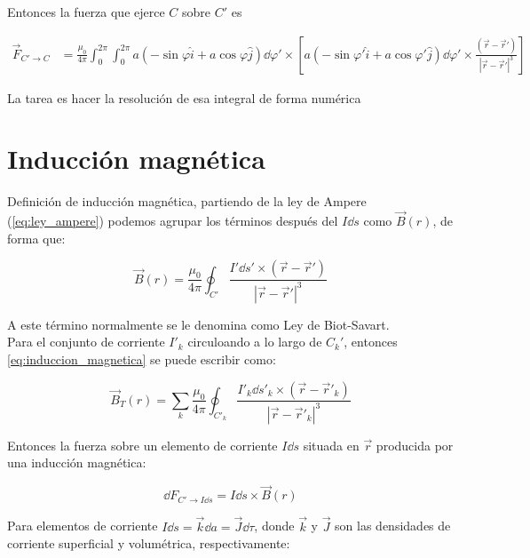 \documentclass[11pt]{report}
\theoremstyle{plain}
\theoremstyle{definition}
\begin{document}
	Entonces la fuerza que ejerce $C$ sobre $C'$ es

	\begin{align*}
		\vec{F}_{C'\rightarrow C}&= \frac{\mu_0}{4\pi}\int_0^{2\pi}\int_0^{2\pi} a \left(-\sin\varphi\hat{i} + a\cos\varphi\hat{j}\right)\dd{\varphi'} \times \left[ a \left(-\sin\varphi'\hat{i} + a\cos\varphi'\hat{j}\right)\dd{\varphi'} \times \frac{(\vec{r} - \vec{r}')}{|\vec{r} - \vec{r}'|^3}\right]
	\end{align*}

La tarea es hacer la resolución de esa integral de forma numérica

\chapter{Inducción magnética}

Definición de inducción magnética, partiendo de la ley de Ampere (\ref{eq:ley_ampere}) podemos agrupar los términos después del $I\dd{s}$ como $\vec{B}(r)$, de forma que:

\begin{equation}
	\vec{B}(r) = \frac{\mu_0}{4\pi}\oint_{C'} \frac{I'\dd{s'}\times\left(\vec{r}-\vec{r}'\right)}{|\vec{r}-\vec{r}'|^3}
	\label{eq:induccion_magnetica}
\end{equation}

A este término normalmente se le denomina como Ley de Biot-Savart.\\

Para el conjunto de corriente $I'_k$ circuloando a lo largo de $C_k'$, entonces \ref{eq:induccion_magnetica} se puede escribir como:

\begin{equation}
	\vec{B}_T(r) = \sum_k \frac{\mu_0}{4\pi}\oint_{C'_k} \frac{I'_k\dd{s'_k}\times\left(\vec{r}-\vec{r}'_k\right)}{|\vec{r}-\vec{r}'_k|^3}
	\label{eq:induccion_magnetica_k}
\end{equation}

Entonces la fuerza sobre un elemento de corriente $I\dd{s}$ situada en $\vec{r}$ producida por una inducción magnética:


\begin{equation*}
	\dd{F}_{C'\rightarrow I\dd{s}} = I\dd{s}\times\vec{B}(r)
\end{equation*}

Para elementos de corriente $I\dd{s}=\vec{k}\dd{a}=\vec{J}\dd{\tau}$, donde $\vec{k}$ y $\vec{J}$ son las densidades de corriente superficial y volumétrica, respectivamente:
\end{document}
